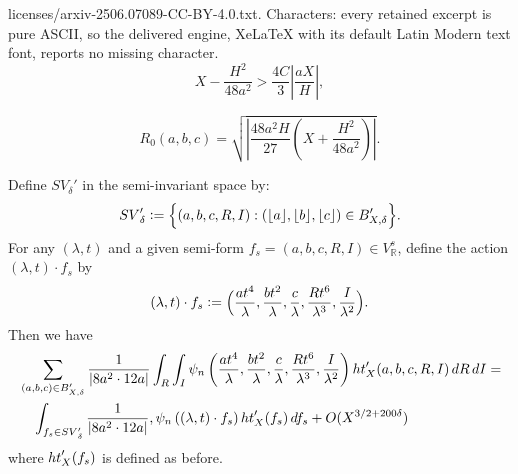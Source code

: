 \documentclass[10pt,a4paper]{amsart}
\def\R{{\mathbb R}}
\def \SV{{SV}_{\delta}}
\def \h{{\rm ht}}
\begin{document}
licenses/arxiv-2506.07089-CC-BY-4.0.txt. Characters: every retained excerpt is pure ASCII, so the delivered engine, XeLaTeX with its default Latin Modern text font, reports no missing character.
    \begin{equation}\label{R0Hp}
        X - \frac{H^2}{48a^2} > \frac{4C}{3} \left| \frac{aX}{H} \right|,
    \end{equation}

    \begin{equation}\label{RoHn}
        R_0(a, b, c) = \sqrt{\left| \frac{48a^2 H}{27} \left( X + \frac{H^2}{48a^2} \right) \right|}.
    \end{equation}

\begin{lemma}\label{help fglueing lemma} 
Define $\SV'$ in the semi-invariant space by:
\begin{equation*}
\SV' \vcentcolon= \Big\{(a,b,c,R,I) : (\lfloor a \rfloor, \lfloor b \rfloor, \lfloor c \rfloor) \in B'_{X,\delta} \Big\}. 
\end{equation*} 
For any $(\lambda, t)$ and a given semi-form $f_s = (a, b, c, R, I) \in V_{\R}^s$, define the action $(\lambda, t) \cdot f_s$ by 
\begin{equation*} 
(\lambda, t) \cdot f_s \vcentcolon= \Big(\frac{at^4}{\lambda}, \frac{bt^2}{\lambda}, \frac{c}{\lambda}, \frac{Rt^6}{\lambda^3}, \frac{I}{\lambda^2}\Big).
\end{equation*}
Then we have
\begin{align*} 
&\sum_{(a,b,c) \in B'_{X,\delta}} \frac{1}{|8a^2 \cdot 12a|} \int_R \int_I \psi_{n} \left( \frac{at^4}{\lambda}, \frac{bt^2}{\lambda}, \frac{c}{\lambda}, \frac{Rt^6}{\lambda^3}, \frac{I}{\lambda^2} \right) \h_X'(a,b,c,R,I) \, dR \, dI 
= \\
&\quad\int_{f_s \in \SV'} \frac{1}{|8a^2 \cdot 12a|} , \psi_{n}\left((\lambda, t) \cdot f_s\right) \h_X'(f_s) \, df_s +
O(X^{3/2 +200\delta}) \end{align*} 
where $\h_X'(f_s)$ is defined as before.
\end{lemma}
\end{document}
